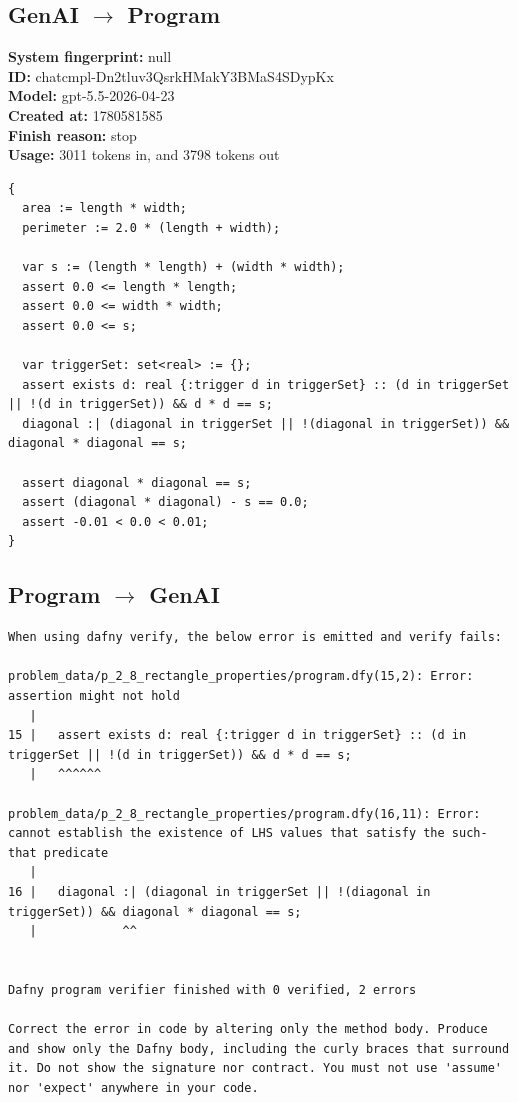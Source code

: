 \documentclass{article}
\begin{document}
\subsection*{GenAI $\rightarrow$ Program}
\textbf{System fingerprint: }null
\\\textbf{ID: }chatcmpl-Dn2tluv3QsrkHMakY3BMaS4SDypKx
\\\textbf{Model: }gpt-5.5-2026-04-23
\\\textbf{Created at: }1780581585
\\\textbf{Finish reason: }stop
\\\textbf{Usage: }3011 tokens in, and 3798 tokens out
\begin{lstlisting}
{
  area := length * width;
  perimeter := 2.0 * (length + width);

  var s := (length * length) + (width * width);
  assert 0.0 <= length * length;
  assert 0.0 <= width * width;
  assert 0.0 <= s;

  var triggerSet: set<real> := {};
  assert exists d: real {:trigger d in triggerSet} :: (d in triggerSet || !(d in triggerSet)) && d * d == s;
  diagonal :| (diagonal in triggerSet || !(diagonal in triggerSet)) && diagonal * diagonal == s;

  assert diagonal * diagonal == s;
  assert (diagonal * diagonal) - s == 0.0;
  assert -0.01 < 0.0 < 0.01;
}
\end{lstlisting}
\subsection*{Program $\rightarrow$ GenAI}
\begin{lstlisting}
When using dafny verify, the below error is emitted and verify fails:

problem_data/p_2_8_rectangle_properties/program.dfy(15,2): Error: assertion might not hold
   |
15 |   assert exists d: real {:trigger d in triggerSet} :: (d in triggerSet || !(d in triggerSet)) && d * d == s;
   |   ^^^^^^

problem_data/p_2_8_rectangle_properties/program.dfy(16,11): Error: cannot establish the existence of LHS values that satisfy the such-that predicate
   |
16 |   diagonal :| (diagonal in triggerSet || !(diagonal in triggerSet)) && diagonal * diagonal == s;
   |            ^^


Dafny program verifier finished with 0 verified, 2 errors

Correct the error in code by altering only the method body. Produce and show only the Dafny body, including the curly braces that surround it. Do not show the signature nor contract. You must not use 'assume' nor 'expect' anywhere in your code.
\end{lstlisting}
\end{document}
